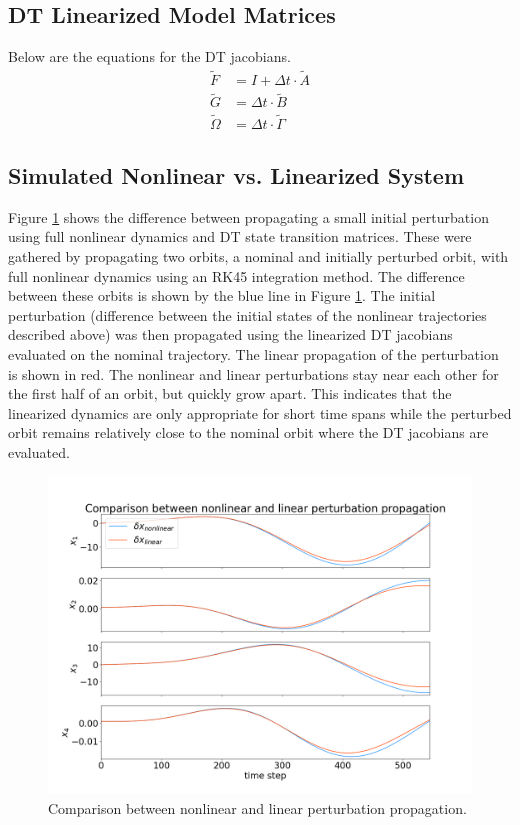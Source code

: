 \documentclass[11pt, a4paper]{article}
\begin{document}
\subsection{DT Linearized Model Matrices}
Below are the equations for the DT jacobians.
\begin{equation}
	\begin{aligned}
		\tilde{F} &= I + \Delta t \cdot \tilde{A} \\
		\tilde{G} &= \Delta t \cdot \tilde{B} \\
		\tilde{\Omega} &= \Delta t \cdot \tilde{\Gamma}
	\end{aligned}
\end{equation}


\subsection{Simulated Nonlinear vs. Linearized System}
Figure \ref{fig:nlvl_s} shows the difference between propagating a small initial perturbation using full nonlinear dynamics and DT state transition matrices. 
These were gathered by propagating two orbits, a nominal and initially perturbed orbit, with full nonlinear dynamics using an RK45 integration method.
The difference between these orbits is shown by the blue line in Figure \ref{fig:nlvl_s}. 
The initial perturbation (difference between the initial states of the nonlinear trajectories described above) was then propagated using the linearized DT jacobians evaluated on the nominal trajectory. 
The linear propagation of the perturbation is shown in red. 
The nonlinear and linear perturbations stay near each other for the first half of an orbit, but quickly grow apart.
This indicates that the linearized dynamics are only appropriate for short time spans while the perturbed orbit remains relatively close to the nominal orbit where the DT jacobians are evaluated. 

\begin{figure}[H]
	\centering
	\includegraphics[width=\textwidth]{./Figures/nonlvl_state.png}
	\caption{Comparison between nonlinear and linear perturbation propagation.}
	\label{fig:nlvl_s}
\end{figure}
\end{document}
